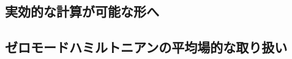 \documentclass[10.5pt,a4paper]{jreport}
\begin{document}
\subsection{実効的な計算が可能な形へ}
\subsection{ゼロモードハミルトニアンの平均場的な取り扱い}
\newpage

\end{document}
